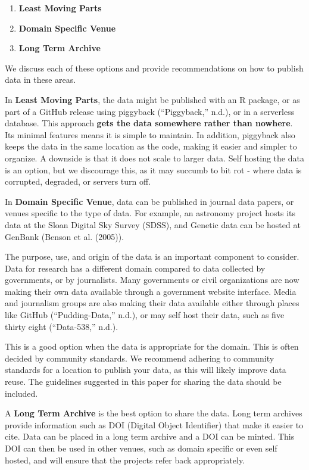 \documentclass[
]{article}
\providecommand{\tightlist}{%
  \setlength{\itemsep}{0pt}\setlength{\parskip}{0pt}}
\begin{document}
\begin{enumerate}
\def\labelenumi{\arabic{enumi}.}
\tightlist
\item
  \textbf{Least Moving Parts}
\item
  \textbf{Domain Specific Venue}
\item
  \textbf{Long Term Archive}
\end{enumerate}

We discuss each of these options and provide recommendations on how to publish data in these areas.

In \textbf{Least Moving Parts}, the data might be published with an R package, or as part of a GitHub release using piggyback (``Piggyback,'' n.d.), or in a serverless database. This approach \textbf{gets the data somewhere rather than nowhere}. Its minimal features means it is simple to maintain. In addition, piggyback also keeps the data in the same location as the code, making it easier and simpler to organize. A downside is that it does not scale to larger data. Self hosting the data is an option, but we discourage this, as it may succumb to bit rot - where data is corrupted, degraded, or servers turn off.

In \textbf{Domain Specific Venue}, data can be published in journal data papers, or venues specific to the type of data. For example, an astronomy project hosts its data at the Sloan Digital Sky Survey (SDSS), and Genetic data can be hosted at GenBank (Benson et al. (2005)).

The purpose, use, and origin of the data is an important component to consider. Data for research has a different domain compared to data collected by governments, or by journalists. Many governments or civil organizations are now making their own data available through a government website interface. Media and journalism groups are also making their data available either through places like GitHub (``Pudding-Data,'' n.d.), or may self host their data, such as five thirty eight (``Data-538,'' n.d.).

This is a good option when the data is appropriate for the domain. This is often decided by community standards. We recommend adhering to community standards for a location to publish your data, as this will likely improve data reuse. The guidelines suggested in this paper for sharing the data should be included.

A \textbf{Long Term Archive} is the best option to share the data. Long term archives provide information such as DOI (Digital Object Identifier) that make it easier to cite. Data can be placed in a long term archive and a DOI can be minted. This DOI can then be used in other venues, such as domain specific or even self hosted, and will ensure that the projects refer back appropriately.
\end{document}
